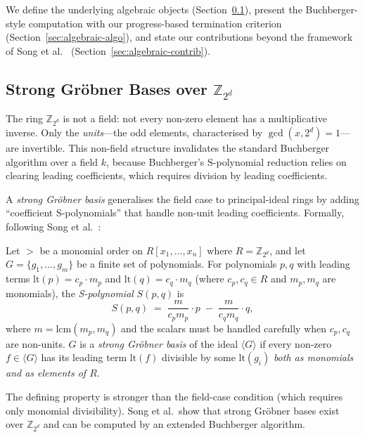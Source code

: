 \documentclass[runningheads]{llncs}
\begin{document}
We define the underlying algebraic objects
(Section~\ref{sec:algebraic-def}), present the Buchberger-style
computation with our progress-based termination
criterion (Section~\ref{sec:algebraic-algo}), and state our
contributions beyond the framework of
Song et al.~\cite{song2024equational}
(Section~\ref{sec:algebraic-contrib}).

\subsection{Strong Gr\"obner Bases over $\mathbb{Z}_{2^d}$}
\label{sec:algebraic-def}

The ring $\mathbb{Z}_{2^d}$ is not a field: not every non-zero
element has a multiplicative inverse. Only the \emph{units}---the
odd elements, characterised by $\gcd(x, 2^d) = 1$---are invertible.
This non-field structure invalidates the standard Buchberger
algorithm over a field $k$, because Buchberger's S-polynomial
reduction relies on clearing leading coefficients, which requires
division by leading coefficients.

A \emph{strong Gr\"obner basis} generalises the field case to
principal-ideal rings by adding ``coefficient S-polynomials'' that
handle non-unit leading coefficients. Formally, following
Song et al.~\cite{song2024equational}:

\begin{definition}
Let $>$ be a monomial order on $R[x_1, \ldots, x_n]$ where
$R = \mathbb{Z}_{2^d}$, and let $G = \{g_1, \ldots, g_m\}$ be a
finite set of polynomials. For polynomials $p, q$ with leading
terms $\mathrm{lt}(p) = c_p \cdot m_p$ and
$\mathrm{lt}(q) = c_q \cdot m_q$ (where $c_p, c_q \in R$ and
$m_p, m_q$ are monomials), the \emph{S-polynomial}
$S(p, q)$ is
\[
  S(p, q) \;=\; \frac{m}{c_p m_p} \cdot p \;-\;
                \frac{m}{c_q m_q} \cdot q,
\]
where $m = \mathrm{lcm}(m_p, m_q)$ and the scalars must be
handled carefully when $c_p, c_q$ are non-units.
$G$ is a \emph{strong Gr\"obner basis} of the ideal $\langle G \rangle$
if every non-zero $f \in \langle G \rangle$ has its leading term
$\mathrm{lt}(f)$ divisible by some $\mathrm{lt}(g_i)$
\emph{both as monomials and as elements of $R$}.
\end{definition}

The defining property is stronger than the field-case condition
(which requires only monomial divisibility). Song et al.\ show that
strong Gr\"obner bases exist over $\mathbb{Z}_{2^d}$ and can be
computed by an extended Buchberger algorithm.
\end{document}
